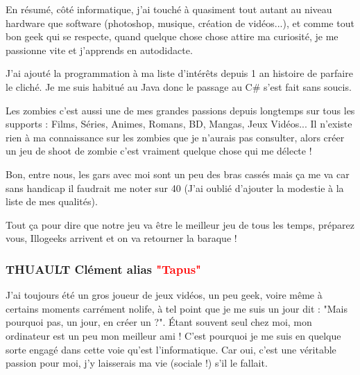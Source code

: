 \documentclass{article}
\begin{document}
\par
En résumé, côté informatique, j'ai touché à quasiment tout autant au niveau hardware que software (photoshop, musique, création de vidéos...), et comme tout bon geek qui se respecte, quand quelque chose chose attire ma curiosité, je me passionne vite et j'apprends en autodidacte.
\newline


\par

\par
J'ai ajouté la programmation à ma liste d'intérêts depuis 1 an histoire de parfaire le cliché.  Je me suis habitué au Java donc le passage au C\# s'est fait sans soucis. 
\newline

\par
Les zombies c'est aussi une de mes grandes passions depuis longtemps sur tous les supports : Films, Séries, Animes, Romans, BD, Mangas, Jeux Vidéos...  Il n'existe rien à ma connaissance sur les zombies que je n'aurais pas consulter, alors créer un jeu de shoot de zombie c'est vraiment quelque chose qui me délecte !
\newline

\fontsize{9}{9}
\par
\small Bon, entre nous, les gars avec moi sont un peu des bras cassés mais ça me va car sans handicap il faudrait me noter sur 40 (J’ai oublié d'ajouter la modestie à la liste de mes qualités).
\newline

\par

\fontsize{12}{12}
\par
\normalsize Tout ça pour dire que notre jeu va être le meilleur jeu de tous les temps, préparez vous, Illogeeks arrivent et on va retourner la baraque !
\newline




\newpage
\subsubsection{THUAULT Clément alias \textcolor{red}{"Tapus"}}

\par
J'ai toujours été un gros joueur de jeux vidéos, un peu geek, voire même à certains moments carrément nolife, à tel point que je me suis un jour dit : "Mais pourquoi pas, un jour, en créer un ?". Étant souvent seul chez moi, mon ordinateur est un peu mon meilleur ami ! C'est pourquoi je me suis en quelque sorte engagé dans cette voie qu'est l'informatique. Car oui, c'est une véritable passion pour moi, j'y laisserais ma vie (sociale !) s'il le fallait.
\newline
\end{document}
